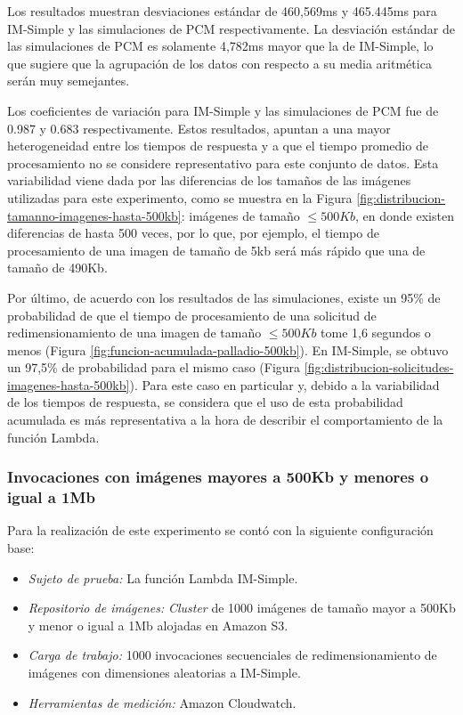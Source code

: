 Los resultados muestran desviaciones estándar de 460,569ms y 465.445ms para IM-Simple y las simulaciones de PCM respectivamente. La desviación estándar de las simulaciones de PCM es solamente 4,782ms mayor que la de IM-Simple, lo que sugiere que la agrupación de los datos con respecto a su media aritmética serán muy semejantes.

Los coeficientes de variación para IM-Simple y las simulaciones de PCM fue de 0.987 y 0.683 respectivamente. Estos resultados, apuntan a una mayor heterogeneidad entre los tiempos de respuesta y a que el tiempo promedio de procesamiento no se considere representativo para este conjunto de datos. Esta variabilidad viene dada por las diferencias de los tamaños de las imágenes utilizadas para este experimento, como se muestra en la Figura \ref{fig:distribucion-tamanno-imagenes-hasta-500kb}: imágenes de tamaño $\leq 500Kb$, en donde existen diferencias de hasta 500 veces, por lo que, por ejemplo, el tiempo de procesamiento de una imagen de tamaño de 5kb será más rápido que una de tamaño de 490Kb.

Por último, de acuerdo con los resultados de las simulaciones, existe un 95\% de probabilidad de que el tiempo de procesamiento de una solicitud de redimensionamiento de una imagen de tamaño $\leq 500Kb$ tome 1,6 segundos o menos (Figura \ref{fig:funcion-acumulada-palladio-500kb}). En IM-Simple, se obtuvo un 97,5\% de probabilidad para el mismo caso (Figura \ref{fig:distribucion-solicitudes-imagenes-hasta-500kb}). Para este caso en particular y, debido a la variabilidad de los tiempos de respuesta, se considera que el uso de esta probabilidad acumulada es más representativa a la hora de describir el comportamiento de la función Lambda.

\subsubsection{Invocaciones con imágenes mayores a 500Kb y menores o igual a 1Mb}
Para la realización de este experimento se contó con la siguiente configuración base:
\begin{itemize}
    \item \emph{Sujeto de prueba:} La función Lambda IM-Simple.
    \item \emph{Repositorio de imágenes:} \emph{Cluster} de 1000 imágenes de tamaño mayor a 500Kb y menor o igual a 1Mb alojadas en Amazon S3.     
    \item \emph{Carga de trabajo:} 1000 invocaciones secuenciales de redimensionamiento de imágenes con dimensiones aleatorias a IM-Simple.
    \item \emph{Herramientas de medición:} Amazon Cloudwatch.
\end{itemize}

